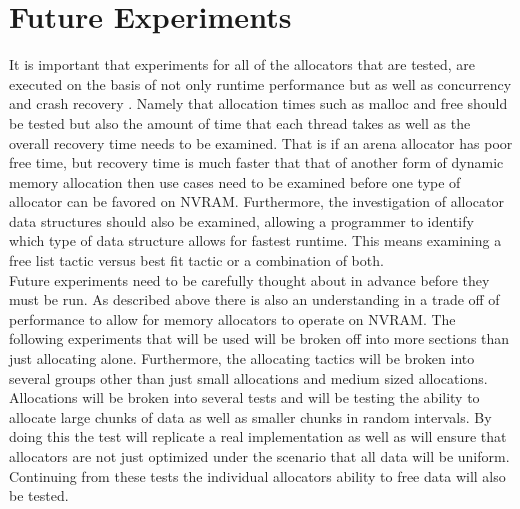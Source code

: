\documentclass[conference]{IEEEtran}
\begin{document}
\section{Future Experiments}
It is important that experiments for all of the allocators that are tested, are executed on the basis of not only runtime performance but as well as concurrency and crash recovery \cite{Makalu}. Namely that allocation times such as malloc and free should be tested but also the amount of time that each thread takes as well as the overall recovery time needs to be examined. That is if an arena allocator has poor free time, but recovery time is much faster that that of another form of dynamic memory allocation then use cases need to be examined before one type of allocator can be favored on NVRAM. Furthermore, the investigation of allocator data structures should also be examined, allowing a programmer to identify which type of data structure allows for fastest runtime. This means examining a free list tactic versus best fit tactic or a combination of both. 
\\
Future experiments need to be carefully thought about in advance before they must be run. As described above there is also an understanding in a trade off of performance to allow for memory allocators to operate on NVRAM. The following experiments that will be used will be broken off into more sections than just allocating alone. Furthermore, the allocating tactics will be broken into several groups other than just small allocations and medium sized allocations. Allocations will be broken into several tests and will be testing the ability to allocate large chunks of data as well as smaller chunks in random intervals. By doing this the test will replicate a real implementation as well as will ensure that allocators are not just optimized under the scenario that all data will be uniform. Continuing from these tests the individual allocators ability to free data will also be tested. 
\end{document}

